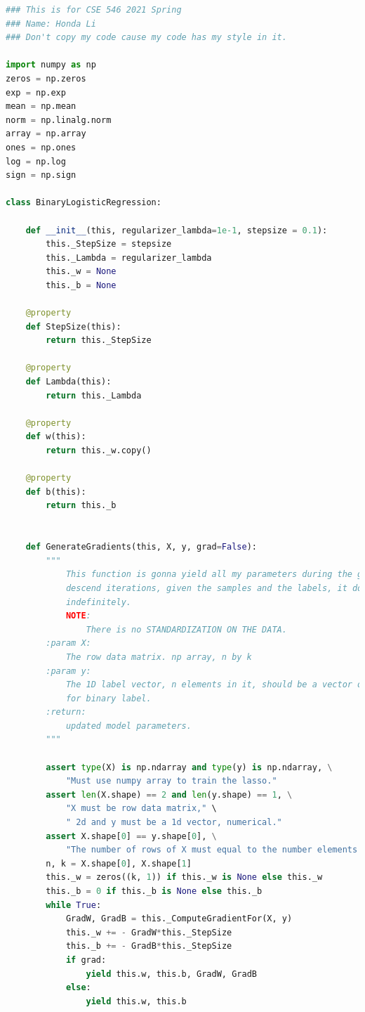 \documentclass[]{article}
\begin{document}
        \begin{lstlisting}[language=python]
### This is for CSE 546 2021 Spring
### Name: Honda Li
### Don't copy my code cause my code has my style in it.

import numpy as np
zeros = np.zeros
exp = np.exp
mean = np.mean
norm = np.linalg.norm
array = np.array
ones = np.ones
log = np.log
sign = np.sign

class BinaryLogisticRegression:

    def __init__(this, regularizer_lambda=1e-1, stepsize = 0.1):
        this._StepSize = stepsize
        this._Lambda = regularizer_lambda
        this._w = None
        this._b = None

    @property
    def StepSize(this):
        return this._StepSize

    @property
    def Lambda(this):
        return this._Lambda

    @property
    def w(this):
        return this._w.copy()

    @property
    def b(this):
        return this._b


    def GenerateGradients(this, X, y, grad=False):
        """
            This function is gonna yield all my parameters during the gradient
            descend iterations, given the samples and the labels, it does it,
            indefinitely.
            NOTE:
                There is no STANDARDIZATION ON THE DATA.
        :param X:
            The row data matrix. np array, n by k
        :param y:
            The 1D label vector, n elements in it, should be a vector of {1, -1}
            for binary label.
        :return:
            updated model parameters.
        """

        assert type(X) is np.ndarray and type(y) is np.ndarray, \
            "Must use numpy array to train the lasso."
        assert len(X.shape) == 2 and len(y.shape) == 1, \
            "X must be row data matrix," \
            " 2d and y must be a 1d vector, numerical."
        assert X.shape[0] == y.shape[0], \
            "The number of rows of X must equal to the number elements in y. "
        n, k = X.shape[0], X.shape[1]
        this._w = zeros((k, 1)) if this._w is None else this._w
        this._b = 0 if this._b is None else this._b
        while True:
            GradW, GradB = this._ComputeGradientFor(X, y)
            this._w += - GradW*this._StepSize
            this._b += - GradB*this._StepSize
            if grad:
                yield this.w, this.b, GradW, GradB
            else:
                yield this.w, this.b


\end{lstlisting}
\end{document}
